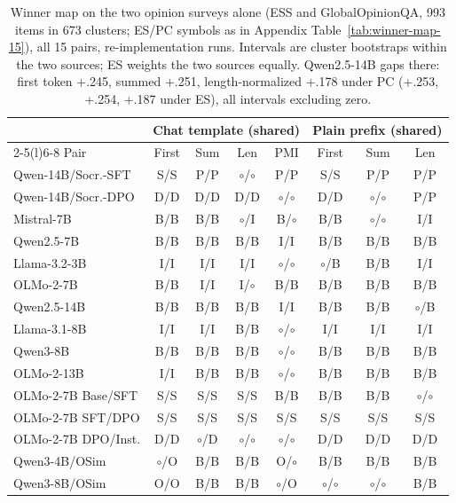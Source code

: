 \begin{table}[t]
\centering\scriptsize
\setlength{\tabcolsep}{2.2pt}
\begin{tabular}{@{}lcccc@{\hspace{4pt}}ccc@{}}
\toprule
& \multicolumn{4}{c}{Chat template (shared)} & \multicolumn{3}{c}{Plain prefix (shared)} \\
\cmidrule(lr){2-5}\cmidrule(l){6-8}
Pair & First & Sum & Len & PMI & First & Sum & Len \\
\midrule
Qwen-14B/Socr.-SFT & S/S & P/P & $\circ$/$\circ$ & P/P & S/S & P/P & P/P \\
Qwen-14B/Socr.-DPO & D/D & D/D & D/D & $\circ$/$\circ$ & D/D & $\circ$/$\circ$ & P/P \\
Mistral-7B & B/B & B/B & $\circ$/I & B/$\circ$ & B/B & $\circ$/$\circ$ & I/I \\
Qwen2.5-7B & B/B & B/B & B/B & I/I & B/B & B/B & B/B \\
Llama-3.2-3B & I/I & I/I & I/I & $\circ$/$\circ$ & $\circ$/B & B/B & I/I \\
OLMo-2-7B & B/B & I/I & I/$\circ$ & B/B & B/B & B/B & B/B \\
Qwen2.5-14B & B/B & B/B & B/B & I/I & B/B & B/B & $\circ$/B \\
Llama-3.1-8B & I/I & I/I & B/B & $\circ$/$\circ$ & I/I & I/I & I/I \\
Qwen3-8B & B/B & B/B & B/B & $\circ$/$\circ$ & B/B & B/B & B/B \\
OLMo-2-13B & I/I & B/B & B/B & $\circ$/$\circ$ & B/B & B/B & B/B \\
OLMo-2-7B Base/SFT & S/S & S/S & S/S & B/B & B/B & B/B & $\circ$/$\circ$ \\
OLMo-2-7B SFT/DPO & S/S & S/S & S/S & S/S & S/S & S/S & S/S \\
OLMo-2-7B DPO/Inst. & D/D & $\circ$/D & $\circ$/$\circ$ & $\circ$/$\circ$ & D/D & D/D & D/D \\
Qwen3-4B/OSim & $\circ$/O & B/B & B/B & O/$\circ$ & B/B & B/B & B/B \\
Qwen3-8B/OSim & O/O & B/B & B/B & $\circ$/O & $\circ$/$\circ$ & $\circ$/$\circ$ & B/B \\
\bottomrule
\end{tabular}
\caption{Winner map on the two opinion surveys alone (ESS and GlobalOpinionQA, 993 items in 673 clusters; ES/PC symbols as in Appendix Table~\ref{tab:winner-map-15}), all 15 pairs, re-implementation runs. Intervals are cluster bootstraps within the two sources; ES weights the two sources equally. Qwen2.5-14B gaps there: first token +.245, summed +.251, length-normalized +.178 under PC (+.253, +.254, +.187 under ES), all intervals excluding zero.}
\label{tab:opinion-subset}
\end{table}
